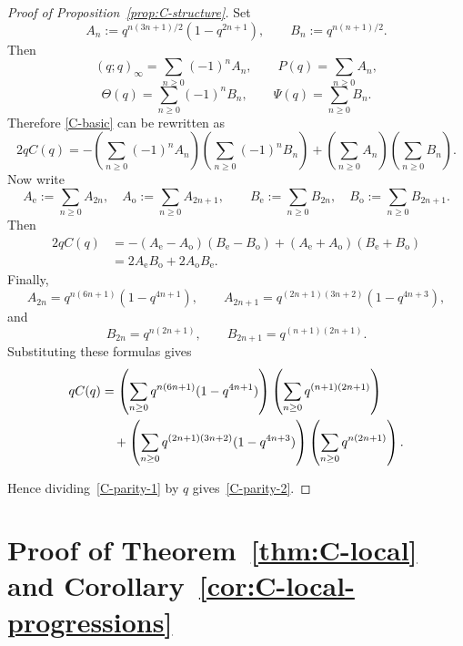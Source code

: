\documentclass[reqno]{amsart}
\theoremstyle{plain}
\theoremstyle{definition}
\theoremstyle{remark}
\numberwithin{equation}{section}
\begin{document}
\begin{proof}[Proof of Proposition~\ref{prop:C-structure}]
Set
\[
A_n:=q^{n(3n+1)/2}(1-q^{2n+1}),
\qquad
B_n:=q^{n(n+1)/2}.
\]
Then
\[
(q;q)_\infty=\sum_{n\ge 0}(-1)^nA_n,
\qquad
P(q)=\sum_{n\ge 0}A_n,
\]
\[
\Theta(q)=\sum_{n\ge 0}(-1)^nB_n,
\qquad
\Psi(q)=\sum_{n\ge 0}B_n.
\]
Therefore \eqref{C-basic} can be rewritten as
\[
2qC(q)
= -\left(\sum_{n\ge 0}(-1)^nA_n\right)\left(\sum_{n\ge 0}(-1)^nB_n\right)
  +\left(\sum_{n\ge 0}A_n\right)\left(\sum_{n\ge 0}B_n\right).
\]
Now write
\[
A_{\mathrm e}:=\sum_{n\ge 0}A_{2n},\quad A_{\mathrm o}:=\sum_{n\ge 0}A_{2n+1},
\qquad
B_{\mathrm e}:=\sum_{n\ge 0}B_{2n},\quad B_{\mathrm o}:=\sum_{n\ge 0}B_{2n+1}.
\]
Then
\[
\begin{aligned}
2qC(q)
&=-(A_{\mathrm e}-A_{\mathrm o})(B_{\mathrm e}-B_{\mathrm o})
  +(A_{\mathrm e}+A_{\mathrm o})(B_{\mathrm e}+B_{\mathrm o})\\
&=2A_{\mathrm e}B_{\mathrm o}+2A_{\mathrm o}B_{\mathrm e}.
\end{aligned}
\]
Finally,
\[
A_{2n}=q^{n(6n+1)}(1-q^{4n+1}),
\qquad
A_{2n+1}=q^{(2n+1)(3n+2)}(1-q^{4n+3}),
\]
and
\[
B_{2n}=q^{n(2n+1)},
\qquad
B_{2n+1}=q^{(n+1)(2n+1)}.
\]
Substituting these formulas gives
\begin{align}
qC(q)
&=
\left(\sum_{n\ge 0} q^{n(6n+1)}(1-q^{4n+1})\right)
\left(\sum_{n\ge 0} q^{(n+1)(2n+1)}\right) \notag\\
&\quad+
\left(\sum_{n\ge 0} q^{(2n+1)(3n+2)}(1-q^{4n+3})\right)
\left(\sum_{n\ge 0} q^{n(2n+1)}\right). \label{C-parity-1}
\end{align}

Hence dividing~\eqref{C-parity-1} by $q$ gives~\eqref{C-parity-2}.
\end{proof}
\section{Proof of Theorem~\ref{thm:C-local} and Corollary~\ref{cor:C-local-progressions}}\label{sec:proof-C-local}
\end{document}
